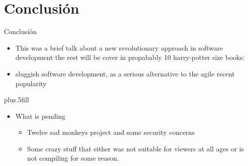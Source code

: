 \section*{Conclusión}

\begin{frame}{Conclusión}

  \begin{itemize}
  \item
    This was a brief  \alert{talk about a new revolutionary approach in software development} the rest will be cover in propabably 10 harry-potter size books:
  \item
    \alert{sluggish software development}, as a serious alternative to the agile recent popularity   
 
    
  \end{itemize}
  
  \vskip0pt plus.5fill
  \begin{itemize}
  \item
    What is pending
    \begin{itemize}
    \item
      Twelve sad monkeys project and some security concerns
    \item
      Some crazy stuff that either was not suitable for viewers at all ages or is not compiling for some reason.  
    \end{itemize}
  \end{itemize}
\end{frame}

